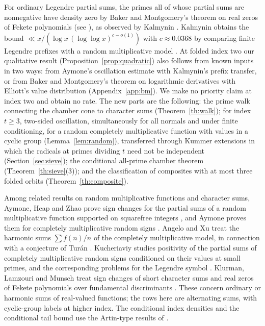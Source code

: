 \documentclass[11pt,reqno]{amsart}
\begin{document}
For ordinary Legendre partial sums, the primes all of whose partial sums are nonnegative have density zero by Baker and Montgomery's theorem on real zeros of Fekete polynomials \cite{BM} (see \cite[p.~866]{CGPS}), as observed by Kalmynin \cite[Theorem~1]{Kal}. Kalmynin obtains the bound \(\ll x/(\log x\,(\log\log x)^{c-o(1)})\) with \(c\approx0.0368\) by comparing finite Legendre prefixes with a random multiplicative model \cite[Theorems~2--3]{Kal}. At folded index two our qualitative result (Proposition~\ref{prop:quadratic}) also follows from known inputs in two ways: from Aymone's oscillation estimate \cite{Aymone} with Kalmynin's prefix transfer, or from Baker and Montgomery's theorem on logarithmic derivatives with Elliott's value distribution (Appendix~\ref{app:bm}). We make no priority claim at index two and obtain no rate. The new parts are the following: the prime walk connecting the chamber cone to character sums (Theorem~\ref{th:walk}); for index \(t\ge3\), two-sided oscillation, simultaneously for all normals and under finite conditioning, for a random completely multiplicative function with values in a cyclic group (Lemma~\ref{lem:random}), transferred through Kummer extensions in which the radicals at primes dividing \(t\) need not be independent (Section~\ref{sec:sieve}); the conditional all-prime chamber theorem (Theorem~\ref{th:sieve}(3)); and the classification of composites with at most three folded orbits (Theorem~\ref{th:composite}).

Among related results on random multiplicative functions and character sums, Aymone, Heap and Zhao prove sign changes for the partial sums of a random multiplicative function supported on squarefree integers \cite{AHZ}, and Aymone proves them for completely multiplicative random signs \cite[Theorem~2]{Aymone}. Angelo and Xu treat the harmonic sums \(\sum f(n)/n\) of the completely multiplicative model, in connection with a conjecture of Tur\'an \cite{AX}. Kucheriaviy studies positivity of the partial sums of completely multiplicative random signs conditioned on their values at small primes, and the corresponding problems for the Legendre symbol \cite{Kuch}. Klurman, Lamzouri and Munsch treat sign changes of short character sums and real zeros of Fekete polynomials over fundamental discriminants \cite[Theorems~1.2 and~1.4]{KLM}. These concern ordinary or harmonic sums of real-valued functions; the rows here are alternating sums, with cyclic-group labels at higher index. The conditional index densities and the conditional tail bound use the Artin-type results of \cite{Hooley,Moree,HKMS,JPS}.
\end{document}
